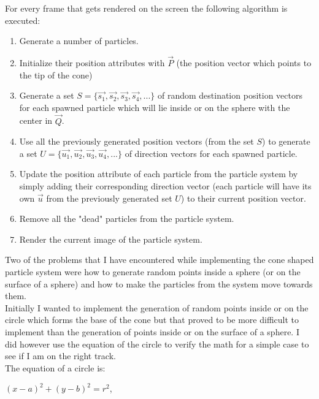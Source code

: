 For every frame that gets rendered on the screen the following algorithm is executed:

\begin{enumerate}
	\item Generate a number of particles.
	
	\item Initialize their position attributes with $\vec{P}$ (the position vector which points to the tip of the cone)
	
	\item Generate a set $S = \{\vec{s_1}, \vec{s_2}, \vec{s_3}, \vec{s_4}, ...\}$ of random destination position vectors for each spawned particle which will lie inside or on the sphere with the center in $\vec{Q}$.
	
	\item Use all the previously generated position vectors (from the set $S$) to generate a set $U = \{\vec{u_1}, \vec{u_2}, \vec{u_3}, \vec{u_4}, ...\}$ of direction vectors for each spawned particle.
	
	\item Update the position attribute of each particle from the particle system by simply adding their corresponding direction vector (each particle will have its own $\vec{u}$ from the previously generated set $U$) to their current position vector.
	
	\item Remove all the "dead" particles from the particle system.
	
	\item Render the current image of the particle system.
\end{enumerate}
\newpage
Two of the problems that I have encountered while implementing the cone shaped particle system were how to generate random points inside a sphere (or on the surface of a sphere) and how to make the particles from the system move towards them.\\

Initially I wanted to implement the generation of random points inside or on the circle which forms the base of the cone but that proved to be more difficult to implement than the generation of points inside or on the surface of a sphere. I did however use the equation of the circle to verify the math for a simple case to see if I am on the right track.\\

The equation of a circle is:
\begin{center}
	$(x - a) ^ 2 + (y - b) ^ 2 = r ^ 2$,
\end{center}

